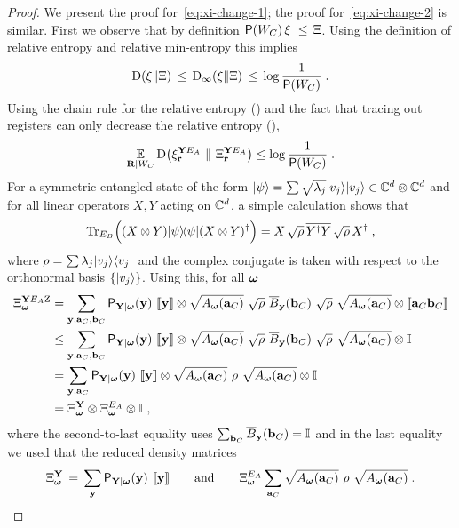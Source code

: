 \begin{proof}
We present the proof for~\eqref{eq:xi-change-1}; the proof for~\eqref{eq:xi-change-2} is similar. 
First we observe that by definition $\P(W_C) \, \xi\,\, \leq \,\Xi$. Using the definition of relative entropy and relative min-entropy this implies
\[ \D(\xi \| \Xi)\,\leq\, \D_\infty(\xi \| \Xi)\, \leq\, \log \frac{1}{\P(W_C)}\;.\]
  Using the chain rule for the relative entropy () and the fact that tracing out registers can only decrease the relative entropy (), 
\begin{equation}\label{eq:claim23-1}
	\Ex_{\bR | W_C} \D \big (\xi_{\br}^{\bY E_A} \,\, \| \,\, \Xi_{\br}^{\bY E_A} \big ) \leq \log \frac{1}{\P(W_C)}\;.
\end{equation}
For a symmetric entangled state of the form $\ket{\psi} = \sum \sqrt{\lambda_j} \ket{v_j}\ket{v_j} \in \C^d \otimes \C^d$ and for all linear operators $X,Y$ acting on $\C^d$, a simple calculation shows that
\[
	\Tr_{E_B} \Big( (X \otimes Y)\ketbra{\psi}{\psi}(X \otimes Y)^\dagger \Big) = X \, \sqrt{\rho} \, \overline{Y^\dagger Y} \, \sqrt{\rho} \, X^\dagger\;,
\]
where $\rho = \sum \lambda_j \ket{v_j}\bra{v_j}$ and the complex conjugate is taken with respect to the orthonormal basis $\{\ket{v_j}\}$.  
	Using this, for all $\bomega$
	\begin{align}
		\Xi_\bomega^{\bY E_A \ac} &= \sum_{\by, \ba_C, \bb_C} \P_{\bY | \bomega}(\by) \,\, \puretomixed{\by} \otimes \sqrt{A_\bomega(\ba_C)} \,\, \sqrt{\rho} \,\, \overline{B}_{\by}(\bb_C) \,\, \sqrt{\rho} \,\, \sqrt{A_\bomega(\ba_C)}  \otimes \puretomixed{\ba_C \bb_C}\notag \\
		&\leq  \sum_{\by, \ba_C, \bb_C} \P_{\bY | \bomega}(\by) \,\, \puretomixed{\by} \otimes \sqrt{A_\bomega(\ba_C)} \,\, \sqrt{\rho} \,\, \overline{B}_{\by}(\bb_C) \,\, \sqrt{\rho} \,\, \sqrt{A_\bomega(\ba_C)} \otimes \Id \notag\\
		&= \sum_{\by, \ba_C} \P_{\bY | \bomega}(\by) \,\, \puretomixed{\by} \otimes \sqrt{A_\bomega(\ba_C)} \,\,\rho\,\, \sqrt{A_\bomega(\ba_C)} \otimes \Id \notag \\
		&= \Xi_\bomega^{\bY} \otimes \Xi_\bomega^{E_A} \otimes \Id \;,\label{eq:claim23-2}
	\end{align}
where the second-to-last equality uses $\sum_{\bb_C} \overline{B}_{\by}(\bb_C) = \Id$ and in the last equality we used that the reduced density matrices
\[\Xi_\bomega^{\bY}\,=\,\sum_{\by} \P_{\bY | \bomega}(\by) \,\, \puretomixed{\by}\qquad\text{and}\qquad \Xi_\bomega^{E_A}\sum_{\ba_C} \sqrt{A_\bomega(\ba_C)} \,\,\rho\,\, \sqrt{A_\bomega(\ba_C)}\;.\]

\end{proof}
